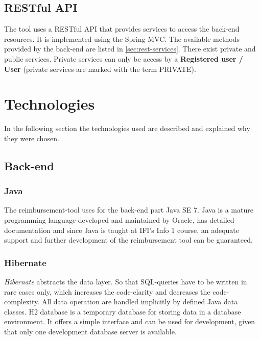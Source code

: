 \subsection{RESTful API}
\label{sec:restfulapi}
The tool uses a RESTful API that provides services to access the back-end resources. It is implemented using the Spring MVC. \newline 
The available methods provided by the back-end are listed in \ref{sec:rest-services}. There exist private and public services. Private services can only be access by a \textbf{Registered user / User} (private services are marked with the term PRIVATE).

\section{Technologies}

In the following section the technologies used are described and explained why they were chosen.

\subsection{Back-end}

\subsubsection{Java}
The reimbursement-tool uses for the back-end part Java SE 7. Java is a mature programming language developed and maintained by Oracle\cite{java}, has detailed documentation and since Java is taught at IFI's Info 1 course, an adequate support and further development of the reimbursement tool can be guaranteed.

\subsubsection{Hibernate}
\textit{Hibernate} abstracts the data layer. So that SQL-queries have to be written in rare cases only, which increases the code-clarity and decreases the code-complexity. All data operation are handled implicitly by defined Java data classes.\newline
H2 database is a temporary database for storing data in a database environment. It offers a simple interface and can be used for development, given that only one development database server is available. \cite{hibernate}

